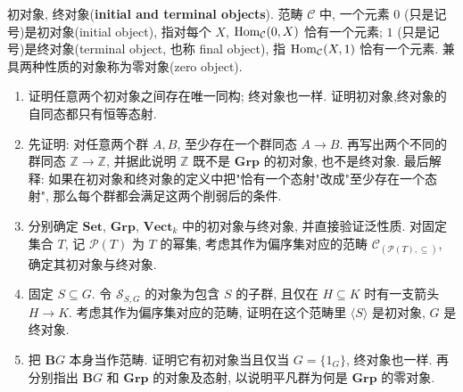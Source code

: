 \documentclass{article}
\begin{document}
\begin{problem}
  {\heiti 初对象, 终对象}(\textbf{initial and terminal objects}). 范畴 $\mathcal C$ 中, 一个元素 $0$ (只是记号)是初对象(initial object), 指对每个 $X$, $\operatorname{Hom}_{\mathcal C}(0,X)$ 恰有一个元素; $1$ (只是记号)是终对象(terminal object, 也称 final object), 指 $\operatorname{Hom}_{\mathcal C}(X,1)$ 恰有一个元素. 兼具两种性质的对象称为零对象(zero object).
  \begin{enumerate}
    \item[(a)] 证明任意两个初对象之间存在唯一同构; 终对象也一样. 证明初对象,终对象的自同态都只有恒等态射.
    \item[(b)] 先证明: 对任意两个群 $A,B$, 至少存在一个群同态 $A\to B$. 再写出两个不同的群同态 $\mathbb Z\to\mathbb Z$, 并据此说明 $\mathbb Z$ 既不是 $\mathbf{Grp}$ 的初对象, 也不是终对象. 最后解释: 如果在初对象和终对象的定义中把"恰有一个态射"改成"至少存在一个态射", 那么每个群都会满足这两个削弱后的条件.
    \item[(c)] 分别确定 $\mathbf{Set}$, $\mathbf{Grp}$, $\mathbf{Vect}_k$ 中的初对象与终对象, 并直接验证泛性质. 对固定集合 $T$, 记 $\mathcal P(T)$ 为 $T$ 的幂集, 考虑其作为偏序集对应的范畴 $\mathcal C_{(\mathcal P(T),\subseteq)}$, 确定其初对象与终对象.
    \item[(d)] 固定 $S\subseteq G$. 令 $\mathcal S_{S,G}$ 的对象为包含 $S$ 的子群, 且仅在 $H\subseteq K$ 时有一支箭头 $H\to K$. 考虑其作为偏序集对应的范畴, 证明在这个范畴里 $\langle S\rangle$ 是初对象, $G$ 是终对象.
    \item[(e)] 把 $\mathbf{B}G$ 本身当作范畴. 证明它有初对象当且仅当 $G=\{1_G\}$, 终对象也一样. 再分别指出 $\mathbf{B}G$ 和 $\mathbf{Grp}$ 的对象及态射, 以说明平凡群为何是 $\mathbf{Grp}$ 的零对象.
  \end{enumerate}
\end{problem}
\end{document}
